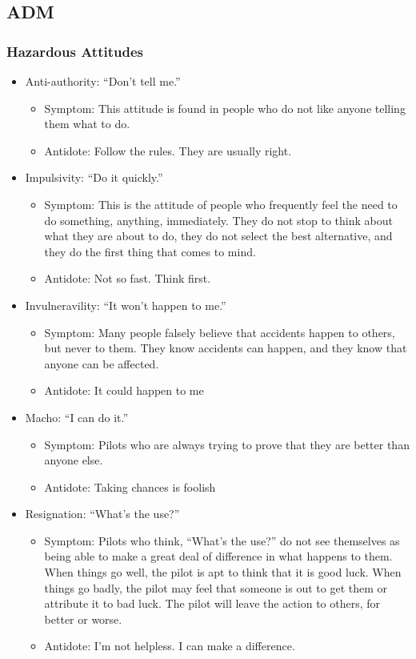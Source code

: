 \documentclass[12pt]{article}
\begin{document}
	\subsection{ADM}
		\subsubsection{Hazardous Attitudes}
			\begin{itemize}
				\item Anti-authority: ``Don't tell me.''
					\begin{itemize}
						\item Symptom: This attitude is found in people who do not like anyone telling them what to do. 
						\item Antidote: Follow the rules. They are usually right.
					\end{itemize}
				\item Impulsivity: ``Do it quickly.''
					\begin{itemize}
						\item Symptom: This is the attitude of people who frequently feel the need to do something, anything, immediately. They do not stop to think about what they are about to do, they do not select the best alternative, and they do the first thing that comes to mind.
						\item Antidote:  Not so fast. Think first.
					\end{itemize}
				\item Invulneravility: ``It won't happen to me.''
					\begin{itemize}
						\item Symptom: Many people falsely believe that accidents happen to others, but never to them. They know accidents can happen, and they know that anyone can be affected.
						\item Antidote: It could happen to me
					\end{itemize}
				\item Macho: ``I can do it.''
					\begin{itemize}
						\item Symptom: Pilots who are always trying to prove that they are better than anyone else.
						\item Antidote: Taking chances is foolish
					\end{itemize}
				\item Resignation: ``What's the use?''
					\begin{itemize}
						\item Symptom: Pilots who think, ``What’s the use?'' do not see themselves as being able to make a great deal of difference in what happens to them. When things go well, the pilot is apt to think that it is good luck. When things go badly, the pilot may feel that someone is out to get them or attribute it to bad luck. The pilot will leave the action to others, for better or worse.
						\item Antidote: I'm not helpless. I can make a difference.
					\end{itemize}
			\end{itemize}
\end{document}
